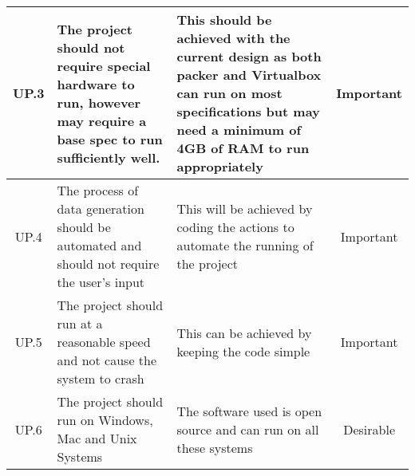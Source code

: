 \begin{tabularx}{\textwidth}{|c|X|X|c|}
 \hline
 UP.3 & The project should not require special hardware to run, however may require a base spec to run sufficiently well. & This should be achieved with the current design as both packer and Virtualbox can run on most specifications but may need a minimum of 4GB of RAM to run appropriately & Important\\
 \hline
 UP.4 & The process of data generation should be automated and should not require the user’s input & This will be achieved by coding the actions to automate the running of the project & Important\\
 \hline
 UP.5 & The project should run at a reasonable speed and not cause the system to crash & This can be achieved by keeping the code simple & Important\\
 \hline
 UP.6 & The project should run on Windows, Mac and Unix Systems & The software used is open source and can run on all these systems & Desirable\\
 \hline
\end{tabularx}